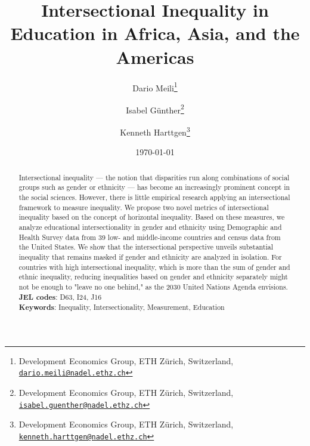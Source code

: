 

\title{Intersectional Inequality in Education in Africa, Asia, and the Americas}
\author{
  Dario Meili\thanks{
    Development Economics Group, ETH Zürich, Switzerland, \href{mailto:dario.meili@nadel.ethz.ch}{\nolinkurl{dario.meili@nadel.ethz.ch}}
  } \and
  Isabel Günther\thanks{
    Development Economics Group, ETH Zürich, Switzerland, \href{mailto:isabel.guenther@nadel.ethz.ch}{\nolinkurl{isabel.guenther@nadel.ethz.ch}}
  } \and
  Kenneth Harttgen\thanks{
    Development Economics Group, ETH Zürich, Switzerland, \href{mailto:kenneth.harttgen@nadel.ethz.ch}{\nolinkurl{kenneth.harttgen@nadel.ethz.ch}}
  }
}
\date{\today}


\maketitle
\thispagestyle{empty} %

\begin{abstract}
  \noindent Intersectional inequality --- the notion that disparities run along combinations of social groups such as gender or ethnicity --- has become an increasingly prominent concept in the social sciences. However, there is little empirical research applying an intersectional framework to measure inequality. We propose two novel metrics of intersectional inequality based on the concept of horizontal inequality. Based on these measures, we analyze educational intersectionality in gender and ethnicity using Demographic and Health Survey data from 39 low- and middle-income countries and census data from the United States. We show that the intersectional perspective unveils substantial inequality that remains masked if gender and ethnicity are analyzed in isolation. For countries with high intersectional inequality, which is more than the sum of gender and ethnic inequality, reducing inequalities based on gender and ethnicity separately might not be enough to "leave no one behind," as the 2030 United Nations Agenda envisions.  \\
  
  \noindent \textbf{JEL codes}: D63, I24, J16  \\
    
  \noindent \textbf{Keywords}: Inequality, Intersectionality, Measurement, Education 
  \end{abstract}
\restoregeometry

